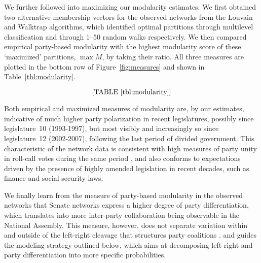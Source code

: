 We further followed \citet[Section~3]{WaughPei2009-A} into maximizing our modularity estimates. We first obtained two alternative membership vectors for the observed networks from the Louvain \citep{BlondelGuillaume2008-JSMTE} and Walktrap \citep{PonsLatapy2006-JGAA} algorithms, which identified optimal partitions through multilevel classification and through 1--50 random walks respectively. We then compared empirical party-based modularity with the highest modularity score of these `maximized' partitions, $\max M$, by taking their ratio. All three measures are plotted in the bottom row of Figure~\ref{fig:measures} and shown in Table~\ref{tbl:modularity}.%

$$\textrm{[TABLE~\ref{tbl:modularity}]}$$

Both empirical and maximized measures of modularity are, by our estimates, indicative of much higher party polarization in recent legislatures, possibly since legislature~10 (1993-1997), but most visibly and increasingly so since legislature~12 (2002-2007), following the last period of divided government. This characteristic of the network data is consistent with high measures of party unity in roll-call votes during the same period \citep[p.~320]{GodboutFoucault2013-FP}, and also conforms to expectations driven by the presence of highly amended legislation in recent decades, such as finance and social security laws.


We finally learn from the measure of party-based modularity in the observed networks that Senate networks express a higher degree of party differentiation, which translates into more inter-party collaboration being observable in the National Assembly. This measure, however, does not separate variation within and outside of the left-right cleavage that structures party coalitions \citep[p.~72-74]{Sauger2010}. and guides the modeling strategy outlined below, which aims at decomposing left-right and party differentiation into more specific probabilities.%

